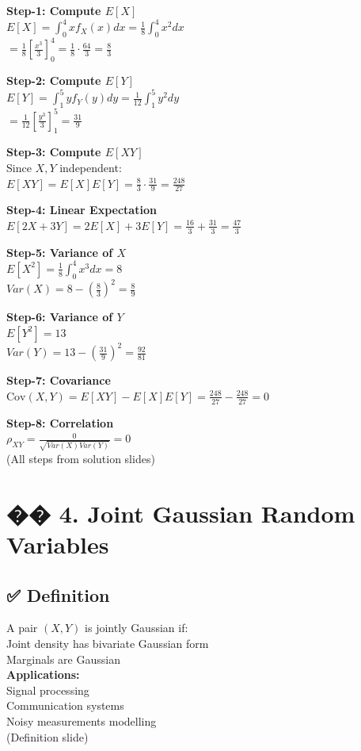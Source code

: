 \documentclass{article}
\begin{document}
\textbf{Step-1: Compute $E[X]$} \\
$E[X]=\int_0^4 x f_X(x)dx =\frac{1}{8}\int_0^4 x^2dx$ \\
$=\frac{1}{8}\left[\frac{x^3}{3}\right]_0^4 =\frac{1}{8}\cdot\frac{64}{3} =\frac{8}{3}$

\textbf{Step-2: Compute $E[Y]$} \\
$E[Y]=\int_1^5 y f_Y(y)dy =\frac{1}{12}\int_1^5 y^2dy$ \\
$=\frac{1}{12}\left[\frac{y^3}{3}\right]_1^5 =\frac{31}{9}$

\textbf{Step-3: Compute $E[XY]$} \\
Since $X,Y$ independent: \\
$E[XY]=E[X]E[Y] =\frac{8}{3}\cdot\frac{31}{9} =\frac{248}{27}$

\textbf{Step-4: Linear Expectation} \\
$E[2X+3Y]=2E[X]+3E[Y] =\frac{16}{3}+\frac{31}{3} =\frac{47}{3}$

\textbf{Step-5: Variance of $X$} \\
$E[X^2]=\frac{1}{8}\int_0^4 x^3dx=8$ \\
$Var(X)=8-\left(\frac{8}{3}\right)^2 =\frac{8}{9}$

\textbf{Step-6: Variance of $Y$} \\
$E[Y^2]=13$ \\
$Var(Y)=13-\left(\frac{31}{9}\right)^2 =\frac{92}{81}$

\textbf{Step-7: Covariance} \\
$\text{Cov}(X,Y)=E[XY]-E[X]E[Y] =\frac{248}{27}-\frac{248}{27}=0$

\textbf{Step-8: Correlation} \\
$\rho_{XY}=\frac{0}{\sqrt{Var(X)Var(Y)}}=0$ \\
(All steps from solution slides)

\section{�� 4. Joint Gaussian Random Variables}

\subsection{✅ Definition}
A pair $(X,Y)$ is jointly Gaussian if: \\
Joint density has bivariate Gaussian form \\
Marginals are Gaussian \\
\textbf{Applications:} \\
Signal processing \\
Communication systems \\
Noisy measurements modelling \\
(Definition slide)
\end{document}
